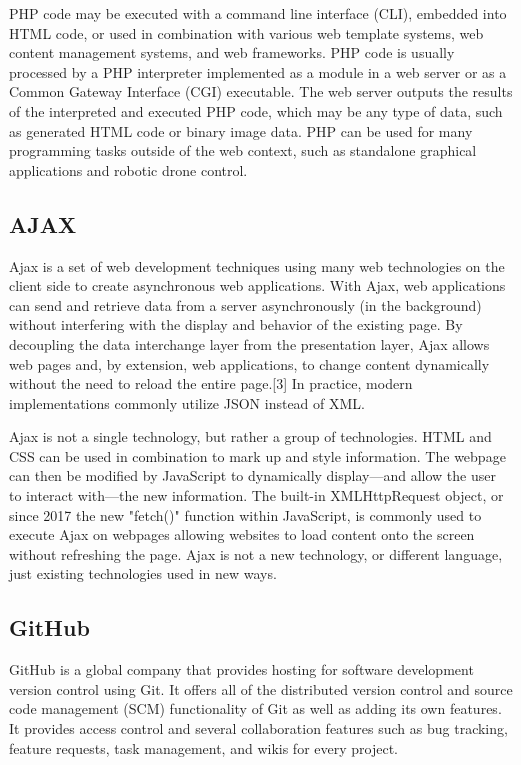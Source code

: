 \documentclass[12pt]{article}
\begin{document}
PHP code may be executed with a command line interface (CLI), embedded into HTML code, or used in combination with various web template systems, web content management systems, and web frameworks. PHP code is usually processed by a PHP interpreter implemented as a module in a web server or as a Common Gateway Interface (CGI) executable. The web server outputs the results of the interpreted and executed PHP code, which may be any type of data, such as generated HTML code or binary image data. PHP can be used for many programming tasks outside of the web context, such as standalone graphical applications and robotic drone control.

\subsection{AJAX}
Ajax is a set of web development techniques using many web technologies on the client side to create asynchronous web applications. With Ajax, web applications can send and retrieve data from a server asynchronously (in the background) without interfering with the display and behavior of the existing page. By decoupling the data interchange layer from the presentation layer, Ajax allows web pages and, by extension, web applications, to change content dynamically without the need to reload the entire page.[3] In practice, modern implementations commonly utilize JSON instead of XML.

Ajax is not a single technology, but rather a group of technologies. HTML and CSS can be used in combination to mark up and style information. The webpage can then be modified by JavaScript to dynamically display—and allow the user to interact with—the new information. The built-in XMLHttpRequest object, or since 2017 the new "fetch()" function within JavaScript, is commonly used to execute Ajax on webpages allowing websites to load content onto the screen without refreshing the page. Ajax is not a new technology, or different language, just existing technologies used in new ways.

\subsection{GitHub}
GitHub is a global company that provides hosting for software development version control using Git. It offers all of the distributed version control and source code management (SCM) functionality of Git as well as adding its own features. It provides access control and several collaboration features such as bug tracking, feature requests, task management, and wikis for every project.
\end{document}
